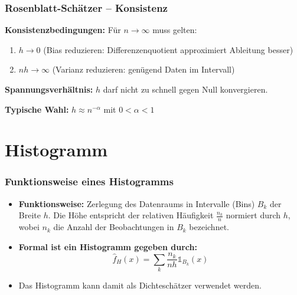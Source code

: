 \documentclass{beamer}
\begin{document}
	\begin{frame}
		\frametitle{Rosenblatt-Schätzer – Konsistenz}
		
		\textbf{Konsistenzbedingungen:} Für $n \to \infty$ muss gelten:
		\begin{enumerate}
			\itemsep8pt
			\item $h \to 0$ \quad (Bias reduzieren: Differenzenquotient approximiert Ableitung besser)
			\item $nh \to \infty$ \quad (Varianz reduzieren: genügend Daten im Intervall)
		\end{enumerate}
		
		\vspace{0.5em}
		
		\textbf{Spannungsverhältnis:} $h$ darf nicht zu schnell gegen Null konvergieren.
		
		\vspace{0.5em}
		
		\textbf{Typische Wahl:} $h \approx n^{-\alpha}$ mit $0 < \alpha < 1$
	\end{frame}
	
	\section{Histogramm}
	
	\begin{frame}
		\frametitle{Funktionsweise eines Histogramms}
		
		\begin{itemize}
			\itemsep8pt
			\item \textbf{Funktionsweise:} Zerlegung des Datenraums in Intervalle (Bins) $B_k$ der Breite $h$. Die Höhe entspricht der relativen Häufigkeit $\frac{n_k}{n}$ normiert durch $h$, wobei $n_k$ die Anzahl der Beobachtungen in $B_k$ bezeichnet.
			\item \textbf{Formal ist ein Histogramm gegeben durch:}
			\[
			\hat f_H(x) = \sum_k \frac{n_k}{nh}\mathds{1}_{B_k}(x)
			\]
			\item Das Histogramm kann damit als Dichteschätzer verwendet werden.
		\end{itemize}
	\end{frame}
	
\end{document}
